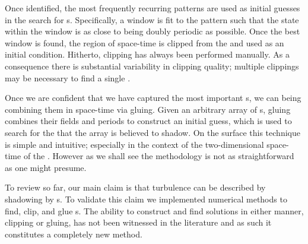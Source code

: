 Once identified, the most frequently recurring patterns are used
as initial guesses in the search for {\fpo}s. Specifically, a {\spt} window is
fit to the pattern such that the state within the window is as close to being
doubly periodic as possible. Once the best window is found, the region of space-time
is clipped from the {\po} and used as an initial condition.
Hitherto, clipping has always been performed manually. As a consequence there
is substantial variability in clipping quality;
multiple clippings may be necessary to find a single {\fpo}.


Once we are confident that we have captured the most important {\fpo}s, we can being
combining them in space-time via gluing.
Given an arbitrary array of {\fpo}s, gluing combines their fields and periods to
construct an initial guess, which is used to search for the {\po} that the array is
believed to shadow.
On the surface this technique is simple and intuitive; especially in the context
of the two-dimensional space-time of the \KSe. However as we shall see the methodology is not
as straightforward as one might presume. %

To review so far, our main claim is that turbulence can be described by
shadowing by {\fpo}s. To validate this claim we implemented
numerical methods to find, clip, and glue {\po}s.
The ability to construct and find solutions in either manner, clipping or gluing,
has not been witnessed in the literature and as such it
constitutes a completely new method.
